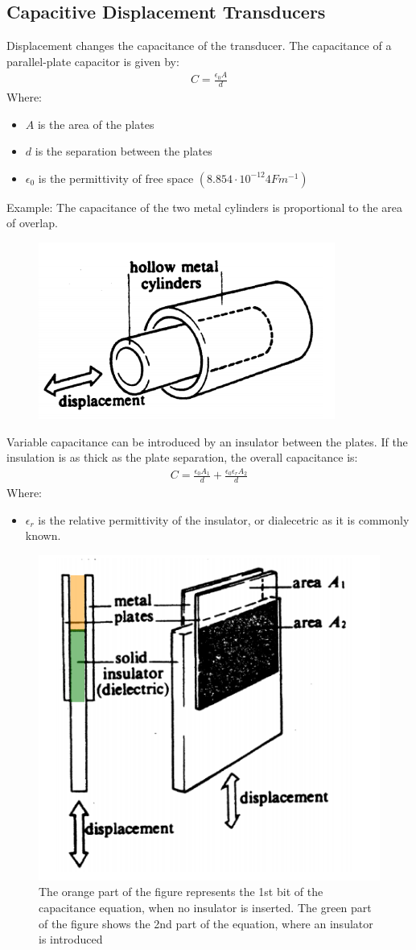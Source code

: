 \documentclass[class=report, crop=false, 12pt,a4paper]{standalone}
\begin{document}
\subsection{Capacitive Displacement Transducers}
Displacement changes the capacitance of the transducer. The capacitance of a parallel-plate capacitor is given by:
\begin{gather}
  C = \frac{\epsilon_0A}{d}
\end{gather}
Where:
\begin{itemize}
  \item $A$ is the area of the plates
  \item $d$ is the separation between the plates
  \item $\epsilon_0$ is the permittivity of free space $(8.854 \cdot 10^{-12}4 Fm^{-1})$
\end{itemize}
Example: The capacitance of the two metal cylinders is proportional to the area of overlap.
\begin{figure}[H]
  \centering
  \includegraphics[width = 0.5 \textwidth]{../img/Mdiagram2.PNG}
\end{figure}
Variable capacitance can be introduced by an insulator between the plates. If the insulation is as thick as the plate separation, the overall capacitance is:
\begin{gather}
  C = \frac{\epsilon_0A_1}{d} + \frac{\epsilon_0\epsilon_rA_2}{d}
\end{gather}
Where:
\begin{itemize}
  \item $\epsilon_r$ is the relative permittivity of the insulator, or dialecetric as it is commonly known.
\end{itemize}
\begin{figure}[H]
  \centering
  \includegraphics[width = 0.45 \textwidth]{../img/Mdiagram3.PNG}
  \caption{The orange part of the figure represents the 1st bit of the capacitance equation, when no insulator is inserted. The green part of the figure shows the 2nd part of the equation, where an insulator is introduced}
\end{figure}
\end{document}
